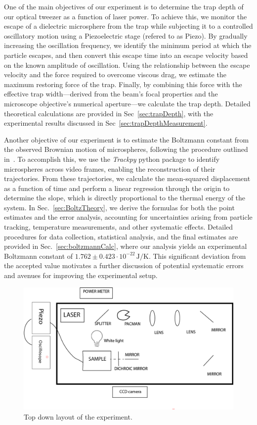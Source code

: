 \documentclass[aps,prb,twocolumn,superscriptaddress,floatfix,longbibliography,citeautoscript]{revtex4-2}
\begin{document}
One of the main objectives of our experiment is to determine the trap depth of our optical tweezer as a function of laser power. To achieve this, we monitor the escape of a dielectric microsphere from the trap while subjecting it to a controlled oscillatory motion using a Piezoelectric stage (refered to as Piezo). By gradually increasing the oscillation frequency, we identify the minimum period at which the particle escapes, and then convert this escape time into an escape velocity based on the known amplitude of oscillation. Using the relationship between the escape velocity and the force required to overcome viscous drag, we estimate the maximum restoring force of the trap. Finally, by combining this force with the effective trap width—derived from the beam's focal properties and the microscope objective's numerical aperture—we calculate the trap depth. Detailed theoretical calculations are provided in Sec~\ref{sec:trapDepth}, with the experimental results discussed in Sec~\ref{sec:trapDepthMeasurement}.

Another objective of our experiment is to estimate the Boltzmann constant from the observed Brownian motion of microspheres, following the procedure outlined in~\cite{nakroshis2003measuring}. To accomplish this, we use the \textit{Trackpy} python package to identify microspheres across video frames, enabling the reconstruction of their trajectories. From these trajectories, we calculate the mean-squared displacement as a function of time and perform a linear regression through the origin to determine the slope, which is directly proportional to the thermal energy of the system. In Sec.~\ref{sec:BoltzTheory}, we derive the formulas for both the point estimates and the error analysis, accounting for uncertainties arising from particle tracking, temperature measurements, and other systematic effects. Detailed procedures for data collection, statistical analysis, and the final estimates are provided in Sec.~\ref{sec:boltzmannCalc}, where our analysis yields an experimental Boltzmann constant of $1.762 \pm 0.423 \cdot 10^{-22}\,\si{\joule\per\kelvin}$. This significant deviation from the accepted value motivates a further discussion of potential systematic errors and avenues for improving the experimental setup.
\begin{figure}
    \centering
    \includegraphics[width=1\linewidth]{Second_draft/figs/tweezer-schmatic.png}
    \caption{Top down layout of the experiment.}
    \label{fig:circuit}
\end{figure}
\end{document}
